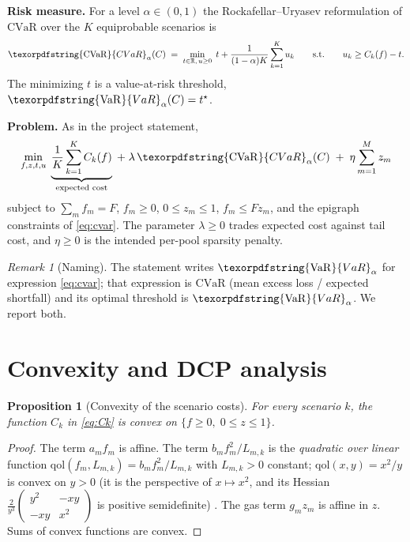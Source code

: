 \documentclass[11pt,a4paper]{article}
\newtheorem{proposition}{Proposition}
\theoremstyle{remark}
\newtheorem{remark}{Remark}
\newcommand{\cvar}{\texorpdfstring{\ensuremath{\mathrm{CVaR}}}{CVaR}}
\newcommand{\var}{\texorpdfstring{\ensuremath{\mathrm{VaR}}}{VaR}}
\begin{document}
\textbf{Risk measure.}  For a level $\alpha\in(0,1)$ the Rockafellar--Uryasev
reformulation \cite{rockafellar2000optimization} of \cvar{} over the $K$ equiprobable
scenarios is
\begin{equation}
\label{eq:cvar}
  \cvar_\alpha(C) \;=\; \min_{t\in\mathbb{R},\, u\ge 0}
  \; t + \frac{1}{(1-\alpha)K}\sum_{k=1}^{K} u_k
  \qquad\text{s.t.}\qquad u_k \ge C_k(f) - t .
\end{equation}
The minimizing $t$ is a value-at-risk threshold, $\var_\alpha(C)=t^\star$.

\textbf{Problem.}  As in the project statement,
\begin{equation}
\label{eq:problem}
  \min_{f,z,t,u}\;
  \underbrace{\frac{1}{K}\sum_{k=1}^{K} C_k(f)}_{\text{expected cost}}
  \;+\; \lambda\, \cvar_\alpha(C)
  \;+\; \eta \sum_{m=1}^{M} z_m
\end{equation}
subject to $\sum_m f_m = F$, $f_m\ge 0$, $0\le z_m\le 1$, $f_m\le F z_m$, and the epigraph
constraints of \eqref{eq:cvar}.  The parameter $\lambda\ge 0$ trades expected cost against
tail cost, and $\eta\ge 0$ is the intended per-pool sparsity penalty.

\begin{remark}[Naming]
The statement writes $\var_\alpha$ for expression \eqref{eq:cvar}; that expression is
\cvar{} (mean excess loss / expected shortfall) and its optimal threshold is $\var_\alpha$.
We report both.
\end{remark}

\section{Convexity and DCP analysis}
\label{sec:convexity}

\begin{proposition}[Convexity of the scenario costs]
For every scenario $k$, the function $C_k$ in \eqref{eq:Ck} is convex on
$\{f\ge 0,\; 0\le z\le 1\}$.
\end{proposition}

\begin{proof}
The term $a_m f_m$ is affine.  The term $b_m f_m^{2}/L_{m,k}$ is the \emph{quadratic
over linear} function $\mathrm{qol}(f_m, L_{m,k}) = b_m f_m^2/L_{m,k}$ with $L_{m,k}>0$
constant; $\mathrm{qol}(x,y)=x^{2}/y$ is convex on $y>0$ (it is the perspective of
$x\mapsto x^{2}$, and its Hessian
$\frac{2}{y^{3}}\left(\begin{smallmatrix} y^{2} & -xy\\ -xy & x^{2}\end{smallmatrix}\right)$ is positive
semidefinite) \cite{boyd2004convex}.  The gas term $g_m z_m$ is affine in $z$.  Sums of
convex functions are convex.
\end{proof}
\end{document}
